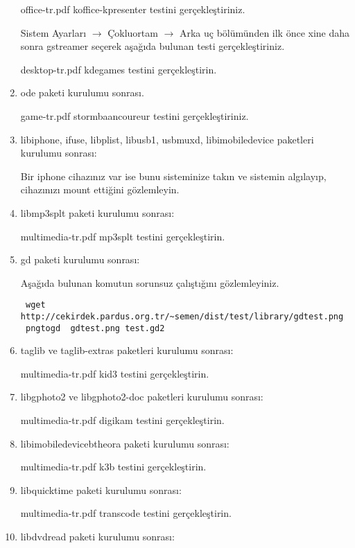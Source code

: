 \documentclass[a4paper,10pt]{article}
\begin{document}
\begin{enumerate}
office-tr.pdf koffice-kpresenter testini gerçekleştiriniz.

Sistem Ayarları $\rightarrow$ Çokluortam $\rightarrow$ Arka uç bölümünden ilk önce xine daha sonra gstreamer seçerek aşağıda bulunan testi gerçekleştiriniz.

desktop-tr.pdf kdegames testini gerçekleştirin.
\item ode paketi kurulumu sonrası.

game-tr.pdf stormbaancoureur testini gerçekleştiriniz.

\item libiphone, ifuse, libplist, libusb1, usbmuxd, libimobiledevice paketleri kurulumu sonrası:

Bir iphone cihazınız var ise bunu sisteminize takın ve sistemin algılayıp, cihazınızı mount ettiğini gözlemleyin.

\item libmp3splt paketi kurulumu sonrası:

multimedia-tr.pdf mp3splt testini gerçekleştirin.

\item gd paketi kurulumu sonrası:

Aşağıda bulunan komutun sorunsuz çalıştığını gözlemleyiniz.

\begin{verbatim}
 wget http://cekirdek.pardus.org.tr/~semen/dist/test/library/gdtest.png
 pngtogd  gdtest.png test.gd2
\end{verbatim}

\item taglib ve taglib-extras paketleri kurulumu sonrası:

multimedia-tr.pdf kid3 testini gerçekleştirin.

\item libgphoto2 ve libgphoto2-doc paketleri kurulumu sonrası:

multimedia-tr.pdf digikam testini gerçekleştirin.

\item libimobiledevicebtheora paketi kurulumu sonrası:

multimedia-tr.pdf k3b testini gerçekleştirin.

\item libquicktime paketi kurulumu sonrası:

multimedia-tr.pdf transcode testini gerçekleştirin.

\item libdvdread paketi kurulumu sonrası:


\end{enumerate}
\end{document}
